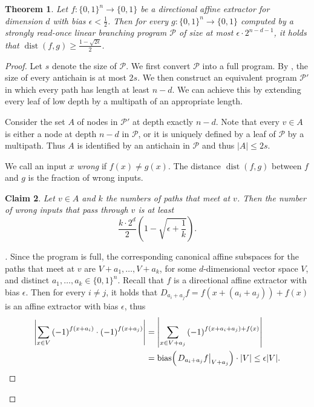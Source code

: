 \documentclass[a4paper,11pt,draft]{article}
\newtheorem{theorem}{Theorem}
\newtheorem{claim}[theorem]{Claim}
\theoremstyle{definition}
\theoremstyle{remark}
\newenvironment{claimproof}[1][\proofname]{\begin{proof}[#1]\renewcommand*{\qedsymbol}{$\blacksquare$}}{\end{proof}}
\DeclareMathOperator{\dist}{dist}
\DeclareMathOperator{\bias}{bias}
\newcommand{\card}[1]{{\left|#1\right|}}
\newcommand{\Q}{{\{0,1\}}}
\newcommand{\calP}{\mathcal{P}}
\newcommand{\restr}[2]{\left.#1\right|_{#2}}
\newcommand{\sreadonce}{strongly read-once}
\begin{document}
\begin{theorem}\label{thm:avg_case_full}
  Let $f\colon \Q^n \to \Q$ be a directional affine extractor for dimension $d$ with bias $\epsilon < \frac{1}{2}$. Then for every $g\colon \Q^n \to \Q$ computed by a \sreadonce{} linear branching program $\calP$ of size at most $\epsilon \cdot 2^{n-d-1}$, it holds that $\dist(f, g) \ge \frac{1-\sqrt{2\epsilon}}{2}$.
\end{theorem}
\begin{proof}
  Let $s$ denote the size of $\calP$. We first convert $\calP$ into a full program. By , the size of every antichain is at most $2s$. We then construct an equivalent program $\calP'$ in which every path has length at least $n-d$. We can achieve this by extending every leaf of low depth by a multipath of an appropriate length. 

  Consider the set $A$ of nodes in $\calP'$ at depth exactly $n-d$. Note that every $v \in A$ is either a node at depth $n - d$ in $\calP$, or it is uniquely defined by a leaf of $\calP$ by a multipath. Thus $A$ is identified by an antichain in $\calP$ and thus $\card{A} \le 2s$.

  We call an input $x$ \emph{wrong} if $f(x) \neq g(x)$. The distance $\dist(f, g)$ between $f$ and $g$ is the fraction of wrong inputs.

  \begin{claim}\label{clm:avg_case_1}
    Let $v \in A$ and $k$ the numbers of paths that meet at $v$. Then the number of wrong inputs that pass through $v$ is at least
    \[
      \frac{k\cdot 2^d}{2} \left(1-\sqrt{\epsilon+\frac{1}{k}}\right).
    \]
  \end{claim}
  \begin{claimproof}
    Since the program is full, the corresponding canonical affine subspaces for the paths that meet at $v$ are $V+a_1, \ldots, V+a_k$, for some $d$-dimensional vector space $V$, and distinct $a_1, \ldots, a_k \in \Q^n$.
    Recall that $f$ is a directional affine extractor with bias $\epsilon$. Then for every $i \neq j$, it holds that $D_{a_i + a_j} f = f(x+(a_i + a_j)) + f(x)$ is an affine extractor with bias $\epsilon$, thus
    \begin{equation}\label{eq:extractor_assumption}
      \begin{aligned}
        \left|\sum_{x \in V} {(-1)}^{f(x+a_i)} \cdot {(-1)}^{f(x+a_j)}\right| &=
        \left|\sum_{x \in V + a_j} {(-1)}^{f(x+a_i+a_j) + f(x)}\right| \\ &=
        \bias\mathopen{}\mathclose\bgroup\left(\restr{D_{a_i + a_j} f}{V+a_j}\aftergroup\egroup\right) \cdot \card{V} \le \epsilon \card{V}.
      \end{aligned}
    \end{equation}


\end{claimproof}
\end{proof}
\end{document}
